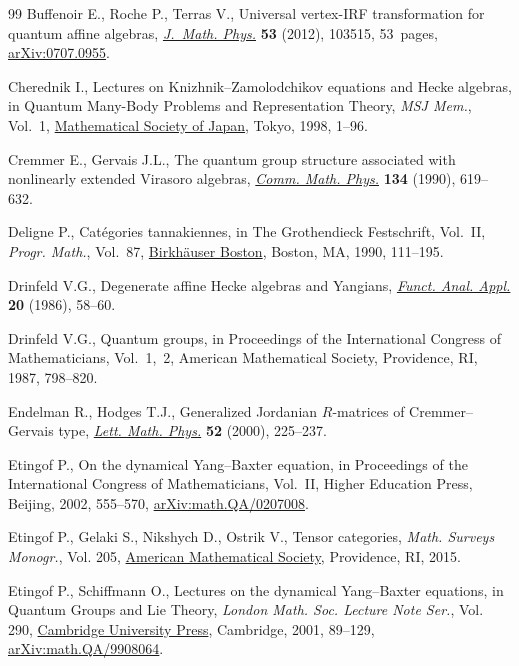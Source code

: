 \documentclass[10pt,a4paper]{amsart}
\numberwithin{equation}{section}
\begin{document}
\begin{thebibliography}{99}
Buffenoir E., Roche P., Terras V., Universal vertex-{IRF} transformation for
 quantum affine algebras, \href{https://doi.org/10.1063/1.4754699}{\textit{J.~Math. Phys.}} \textbf{53} (2012), 103515,
 53~pages, \href{https://arxiv.org/abs/0707.0955}{arXiv:0707.0955}.

Cherednik I., Lectures on {K}nizhnik--{Z}amolodchikov equations and {H}ecke
 algebras, in Quantum {M}any-{B}ody {P}roblems and {R}epresentation {T}heory,
 \textit{MSJ Mem.}, Vol.~1, \href{https://doi.org/10.2969/msjmemoirs/00101C010}{Mathematical Society of Japan}, Tokyo, 1998, 1--96.

Cremmer E., Gervais J.L., The quantum group structure associated with
 nonlinearly extended {V}irasoro algebras, \href{https://doi.org/10.1007/BF02098449}{\textit{Comm. Math. Phys.}}
 \textbf{134} (1990), 619--632.

Deligne P., Cat\'egories tannakiennes, in The {G}rothendieck {F}estschrift,
 {V}ol.~{II}, \textit{Progr. Math.}, Vol.~87, \href{https://doi.org/10.1007/978-0-8176-4575-5_3}{Birkh\"auser Boston}, Boston, MA,
 1990, 111--195.

Drinfeld V.G., Degenerate affine {H}ecke algebras and {Y}angians,
 \href{https://doi.org/10.1007/BF01077318}{\textit{Funct. Anal. Appl.}} \textbf{20} (1986), 58--60.

Drinfeld V.G., Quantum groups, in Proceedings of the {I}nternational {C}ongress
 of {M}athematicians, {V}ol.~1,~2, American Mathematical Society, Providence,
 RI, 1987, 798--820.

Endelman R., Hodges T.J., Generalized {J}ordanian {$R$}-matrices of
 {C}remmer--{G}ervais type, \href{https://doi.org/10.1023/A:1007693603336}{\textit{Lett. Math. Phys.}} \textbf{52} (2000),
 225--237.

Etingof P., On the dynamical {Y}ang--{B}axter equation, in Proceedings of the
 {I}nternational {C}ongress of {M}athematicians, {V}ol.~{II}, Higher Education
 Press, Beijing, 2002, 555--570, \href{https://arxiv.org/abs/math.QA/0207008}{arXiv:math.QA/0207008}.

Etingof P., Gelaki S., Nikshych D., Ostrik V., Tensor categories, \textit{Math.
 Surveys Monogr.}, Vol. 205, \href{https://doi.org/10.1090/surv/205}{American Mathematical Society}, Providence, RI,
 2015.

Etingof P., Schiffmann O., Lectures on the dynamical {Y}ang--{B}axter
 equations, in Quantum {G}roups and {L}ie {T}heory, \textit{London Math. Soc.
 Lecture Note Ser.}, Vol. 290, \href{https://doi.org/10.1017/CBO9780511542848.007}{Cambridge University Press}, Cambridge, 2001,
 89--129, \href{https://arxiv.org/abs/math.QA/9908064}{arXiv:math.QA/9908064}.


\end{thebibliography}
\end{document}
